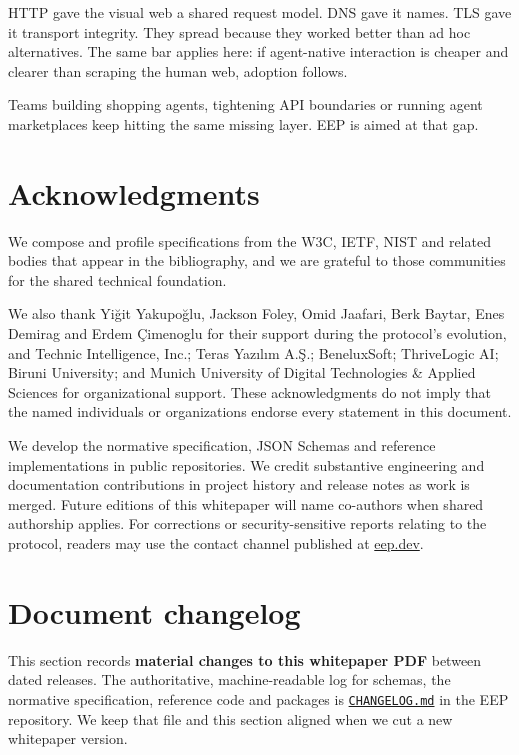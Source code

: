 \documentclass[12pt,a4paper]{article}
\begin{document}
HTTP gave the visual web a shared request model. DNS gave it names. TLS gave it transport integrity. They spread because they worked better than ad hoc alternatives. The same bar applies here: if agent-native interaction is cheaper and clearer than scraping the human web, adoption follows.

Teams building shopping agents, tightening API boundaries or running agent marketplaces keep hitting the same missing layer. EEP is aimed at that gap.

\section*{Acknowledgments}

We compose and profile specifications from the W3C, IETF, NIST and related bodies that appear in the bibliography, and we are grateful to those communities for the shared technical foundation.

We also thank Yiğit Yakupoğlu, Jackson Foley, Omid Jaafari, Berk Baytar, Enes Demirag and Erdem Çimenoglu for their support during the protocol's evolution, and Technic Intelligence, Inc.; Teras Yazılım A.Ş.; BeneluxSoft; ThriveLogic AI; Biruni University; and Munich University of Digital Technologies \& Applied Sciences for organizational support. These acknowledgments do not imply that the named individuals or organizations endorse every statement in this document.

We develop the normative specification, JSON Schemas and reference implementations in public repositories. We credit substantive engineering and documentation contributions in project history and release notes as work is merged. Future editions of this whitepaper will name co-authors when shared authorship applies. For corrections or security-sensitive reports relating to the protocol, readers may use the contact channel published at \href{https://eep.dev}{eep.dev}.

\section*{Document changelog}

This section records \textbf{material changes to this whitepaper PDF} between dated releases. The authoritative, machine-readable log for schemas, the normative specification, reference code and packages is \href{https://github.com/eep-dev/EEP/blob/main/CHANGELOG.md}{\texttt{CHANGELOG.md}} in the EEP repository. We keep that file and this section aligned when we cut a new whitepaper version.
\end{document}
